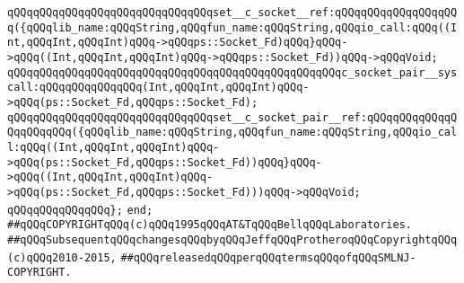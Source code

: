 \verb|qQQqqQQqqQQqqQQqqQQqqQQqqQQqqQQqset__c_socket__ref:qQQqqQQqqQQqqQQqqQQq({qQQqlib_name:qQQqString,qQQqfun_name:qQQqString,qQQqio_call:qQQq((Int,qQQqInt,qQQqInt)qQQq->qQQqps::Socket_Fd)qQQq}qQQq->qQQq((Int,qQQqInt,qQQqInt)qQQq->qQQqps::Socket_Fd))qQQq->qQQqVoid;|\newline
\newline
\verb|qQQqqQQqqQQqqQQqqQQqqQQqqQQqqQQqqQQqqQQqqQQqqQQqqQQqc_socket_pair__syscall:qQQqqQQqqQQqqQQq(Int,qQQqInt,qQQqInt)qQQq->qQQq(ps::Socket_Fd,qQQqps::Socket_Fd);|\newline
\verb|qQQqqQQqqQQqqQQqqQQqqQQqqQQqqQQqset__c_socket_pair__ref:qQQqqQQqqQQqqQQqqQQqqQQq({qQQqlib_name:qQQqString,qQQqfun_name:qQQqString,qQQqio_call:qQQq((Int,qQQqInt,qQQqInt)qQQq->qQQq(ps::Socket_Fd,qQQqps::Socket_Fd))qQQq}qQQq->qQQq((Int,qQQqInt,qQQqInt)qQQq->qQQq(ps::Socket_Fd,qQQqps::Socket_Fd)))qQQq->qQQqVoid;|\newline
\verb|qQQqqQQqqQQqqQQq};|\newline
\verb|end;|\newline
\newline
\newline
\verb|##qQQqCOPYRIGHTqQQq(c)qQQq1995qQQqAT&TqQQqBellqQQqLaboratories.|\newline
\verb|##qQQqSubsequentqQQqchangesqQQqbyqQQqJeffqQQqProtheroqQQqCopyrightqQQq(c)qQQq2010-2015,|\newline
\verb|##qQQqreleasedqQQqperqQQqtermsqQQqofqQQqSMLNJ-COPYRIGHT.|\newline

